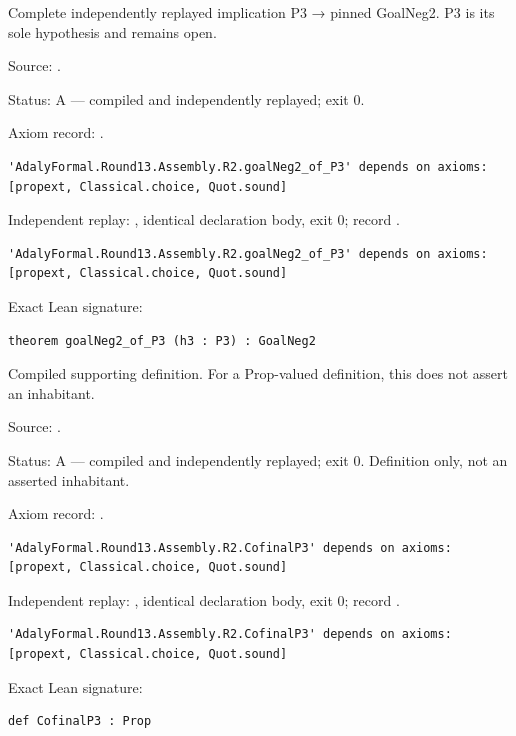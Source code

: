 \begin{theorem}[bp-579]
\label{bp-579}
\leanok
Complete independently replayed implication P3 → pinned GoalNeg2. P3 is its sole hypothesis and remains open.

\par Source: \texttt{}.
\par Status: A — compiled and independently replayed; exit 0.
\par Axiom record: \texttt{}.
\begin{verbatim}
'AdalyFormal.Round13.Assembly.R2.goalNeg2_of_P3' depends on axioms: [propext, Classical.choice, Quot.sound]
\end{verbatim}
\par Independent replay: \texttt{}, identical declaration body, exit 0; record \texttt{}.
\begin{verbatim}
'AdalyFormal.Round13.Assembly.R2.goalNeg2_of_P3' depends on axioms: [propext, Classical.choice, Quot.sound]
\end{verbatim}
\par Exact Lean signature:
\begin{verbatim}
theorem goalNeg2_of_P3 (h3 : P3) : GoalNeg2
\end{verbatim}
\end{theorem}

\begin{definition}[bp-580]
\label{bp-580}
\uses{}
\leanok
Compiled supporting definition. For a Prop-valued definition, this does not assert an inhabitant.

\par Source: \texttt{}.
\par Status: A — compiled and independently replayed; exit 0. Definition only, not an asserted inhabitant.
\par Axiom record: \texttt{}.
\begin{verbatim}
'AdalyFormal.Round13.Assembly.R2.CofinalP3' depends on axioms: [propext, Classical.choice, Quot.sound]
\end{verbatim}
\par Independent replay: \texttt{}, identical declaration body, exit 0; record \texttt{}.
\begin{verbatim}
'AdalyFormal.Round13.Assembly.R2.CofinalP3' depends on axioms: [propext, Classical.choice, Quot.sound]
\end{verbatim}
\par Exact Lean signature:
\begin{verbatim}
def CofinalP3 : Prop
\end{verbatim}
\end{definition}

